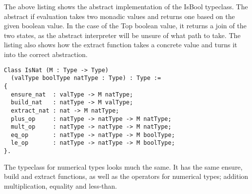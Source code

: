 The above listing shows the abstract implementation of the IsBool typeclass.
The abstract if evaluation takes two monadic values and returns one based on the
given boolean value. In the case of the Top boolean value, it returns a join of
the two states, as the abstract interpreter will be unsure of what path to
take. The listing also shows how the extract function takes a concrete value
and turns it into the correct abstraction.

\begin{verbatim}
Class IsNat (M : Type -> Type)
  (valType boolType natType : Type) : Type :=
{
  ensure_nat  : valType -> M natType;
  build_nat   : natType -> M valType;
  extract_nat : nat -> M natType;
  plus_op     : natType -> natType -> M natType;
  mult_op     : natType -> natType -> M natType;
  eq_op       : natType -> natType -> M boolType;
  le_op       : natType -> natType -> M boolType;
}.
\end{verbatim}

The typeclass for numerical types looks much the same. It has the same ensure,
build and extract functions, as well as the operators for numerical types;
addition multiplication, equality and less-than.


